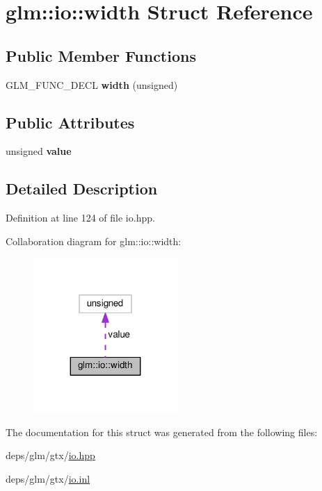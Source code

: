 \hypertarget{structglm_1_1io_1_1width}{}\section{glm\+:\+:io\+:\+:width Struct Reference}
\label{structglm_1_1io_1_1width}
\subsection*{Public Member Functions}
\begin{DoxyCompactItemize}
\item 
\mbox{\label{structglm_1_1io_1_1width_a1576674b7e08dc5014ce4f41ac6eea5b}} 
G\+L\+M\+\_\+\+F\+U\+N\+C\+\_\+\+D\+E\+CL {\bfseries width} (unsigned)
\end{DoxyCompactItemize}
\subsection*{Public Attributes}
\begin{DoxyCompactItemize}
\item 
\mbox{\label{structglm_1_1io_1_1width_a6bf1338eb947811d36ec93bd2e9b8425}} 
unsigned {\bfseries value}
\end{DoxyCompactItemize}


\subsection{Detailed Description}


Definition at line 124 of file io.\+hpp.



Collaboration diagram for glm\+:\+:io\+:\+:width\+:
\nopagebreak
\begin{figure}[H]
\begin{center}
\leavevmode
\includegraphics[width=155pt]{db/d54/structglm_1_1io_1_1width__coll__graph}
\end{center}
\end{figure}


The documentation for this struct was generated from the following files\+:\begin{DoxyCompactItemize}
\item 
deps/glm/gtx/\hyperlink{io_8hpp}{io.\+hpp}\item 
deps/glm/gtx/\hyperlink{io_8inl}{io.\+inl}\end{DoxyCompactItemize}
